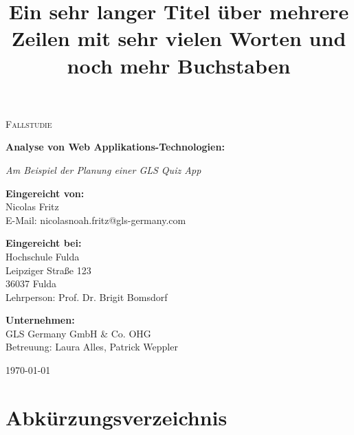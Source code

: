 \documentclass[biblatex]{lni}
\begin{document}
\title[Ein Kurztitel]{Ein sehr langer Titel über mehrere Zeilen mit sehr vielen Worten und noch mehr Buchstaben}

\begin{titlepage}
  \centering
  \vspace*{0.5cm}

  {\scshape\LARGE Fallstudie \par}

  {\huge\bfseries
    Analyse von Web Applikations-Technologien:
  \par
  }
  {\Large\itshape Am Beispiel der Planung einer GLS Quiz App\par}

  \vspace{1cm}

  {\Large\textbf{Eingereicht von: }}\\
  Nicolas Fritz \\
  E-Mail: nicolasnoah.fritz@gls-germany.com

  \vspace{1cm}

  {\Large\textbf{Eingereicht bei: }}\\
  Hochschule Fulda \\
  Leipziger Straße 123 \\
  36037 Fulda \\
  Lehrperson: Prof. Dr. Brigit Bomsdorf

  \vspace{1cm}

  {\Large\textbf{Unternehmen: }}\\
  GLS Germany GmbH & Co. OHG \\
  Betreuung: Laura Alles, Patrick Weppler

  \vfill

  {\large \today\par}
\end{titlepage}

\tableofcontents
\listoffigures
\newpage

\section*{Abkürzungsverzeichnis}
\begin{acronym}[Bash]
\end{acronym}
\newpage
\end{document}
